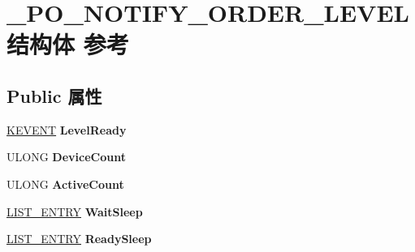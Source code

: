 \hypertarget{struct___p_o___n_o_t_i_f_y___o_r_d_e_r___l_e_v_e_l}{}\section{\+\_\+\+P\+O\+\_\+\+N\+O\+T\+I\+F\+Y\+\_\+\+O\+R\+D\+E\+R\+\_\+\+L\+E\+V\+E\+L结构体 参考}
\label{struct___p_o___n_o_t_i_f_y___o_r_d_e_r___l_e_v_e_l}
\subsection*{Public 属性}
\begin{DoxyCompactItemize}
\item 
\mbox{\label{struct___p_o___n_o_t_i_f_y___o_r_d_e_r___l_e_v_e_l_ae6c1f4fa9ba90118d2d83fc4fd58bb46}} 
\hyperlink{struct___k_e_v_e_n_t}{K\+E\+V\+E\+NT} {\bfseries Level\+Ready}
\item 
\mbox{\label{struct___p_o___n_o_t_i_f_y___o_r_d_e_r___l_e_v_e_l_a8858d371804c596473668615d4c6a2d9}} 
U\+L\+O\+NG {\bfseries Device\+Count}
\item 
\mbox{\label{struct___p_o___n_o_t_i_f_y___o_r_d_e_r___l_e_v_e_l_ace9d5c71abf2c2a19d7fda230e1b269e}} 
U\+L\+O\+NG {\bfseries Active\+Count}
\item 
\mbox{\label{struct___p_o___n_o_t_i_f_y___o_r_d_e_r___l_e_v_e_l_a9fd3ce702e658dc77b49ce3a33aef937}} 
\hyperlink{struct___l_i_s_t___e_n_t_r_y}{L\+I\+S\+T\+\_\+\+E\+N\+T\+RY} {\bfseries Wait\+Sleep}
\item 
\mbox{\label{struct___p_o___n_o_t_i_f_y___o_r_d_e_r___l_e_v_e_l_ac7bf5f8df97bc82bf69fafc1ae23d783}} 
\hyperlink{struct___l_i_s_t___e_n_t_r_y}{L\+I\+S\+T\+\_\+\+E\+N\+T\+RY} {\bfseries Ready\+Sleep}
\item 
\mbox{\label{struct___p_o___n_o_t_i_f_y___o_r_d_e_r___l_e_v_e_l_abb5cd2941b46c64e451d39bae5f41cf1}} 

\end{DoxyCompactItemize}
